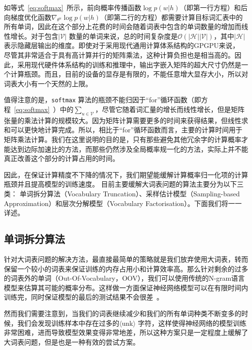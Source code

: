 如等式~\ref{eq:softmax}~所示，前向概率传播函数$\log p(w|h) $（即第一行方程）和后向梯度优化函数$\nabla_{\theta^u}{\log p(w|h)}$（即第二行的方程）都需要计算目标词汇表中的所有单词，因此在这个部分上花费的时间会随着词表中包含的单词数量的增加而线性增长。对于包含$ \mathcal{| V |} $ 数量的单词来说，总的时间复杂度是$ \mathcal {O}(\mathcal {| H || V |})$，其中$ \mathcal {| H |} $表示隐藏层输出的维度。即使对于采用现代通用计算体系结构的GPGPU来说， 尽管其非常适合于具有高计算并行的矩阵乘法，这种计算负担也是相当高的。因此，采用现代硬件体系结构的训练和推理中，输出字嵌入矩阵的超大尺寸仍然是一个计算瓶颈。而且，目前的设备的显存是有限的，不能任意增大显存大小，所以对词表大小有一个天然的上限。

值得注意的是，\texttt{softmax} 算法的瓶颈不能归因于``for''循环函数（即方程~\ref{eq:softmax}~）中的$ \sum_ {u \in \mathcal {V}} $，尽管它随着词汇量的增长而线性增长，但是矩阵张量的乘法计算的规模较大。因为矩阵计算需要更多的时间来获得结果，但线性求和可以更快地计算完成。所以，相比于``for''循环函数而言，主要的计算时间用于矩阵乘法计算。我们在这里说明的目的是，只有那些避免其他冗余字的计算概率才能达到边际加速比的方法，而那些仍然涉及全局概率规一化的方法，实际上并不能真正改善这个部分的计算占用的时间。


因此，在保证计算精度不下降的情况下，我们期望能缓解计算概率归一化项的计算瓶颈并且提高模型的训练速度。 目前主要缓解大词表问题的算法主要分为以下三类： 单词拆分算法（Vocabulary Truncation）、采样估计模型（Sampling-based Approximation）和层次分解模型（Vocabulary Factorisation）。下面我们将一一详述。


\subsection{单词拆分算法}
针对大词表问题的解决方法，最直接最简单的策略就是我们放弃使用大词表，转而保留一个较小的词表来保证训练的内存占用小和计算效率高。那么针对剩余的过多的词表外的单词（Out-Of-Vocabulary，OOV），我们可以使用传统的N-gram语言模型来估算其可能的概率分布。这样做一方面保证神经网络模型可以在有限时间内训练完，同时保证模型的最后的测试结果不会很差~。

然而我们需要注意到，当我们的词表继续减少和我们的所有单词种类不断变多的时候，我们会发现训练样本中存在过多的$\langle$unk$\rangle$ 字符，这样使得神经网络的模型训练非常困难，进而导致模型效果变得非常地差，所以这种方案只是一定程度上缓解了大词表问题，但是也是一种有效的尝试方案。

